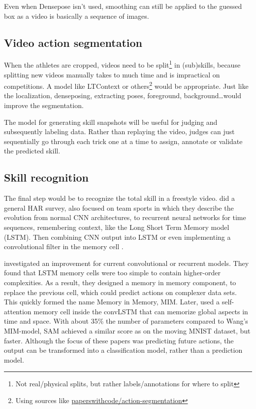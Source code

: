 Even when Densepose isn’t used, smoothing can still be applied to the guessed box as a video is basically a sequence of images.

\subsection{Video action segmentation}

When the athletes are cropped, videos need to be split\footnote{Not real/physical splits, but rather labels/annotations for where to split} in (sub)skills, because splitting new videos manually takes to much time and is impractical on competitions. A model like LTContext \textcite{Jiaming_2023} or others\footnote{Using sources like \href{https://paperswithcode.com/task/action-segmentation}{paperswithcode/action-segmentation}} would be appropriate.
Just like the localization, denseposing, extracting poses, foreground, background\dots would improve the segmentation.

The model for generating skill snapshots will
be useful for judging and subsequently labeling
data. Rather than replaying the video, judges can
just sequentially go through each trick one at a
time to assign, annotate or validate the predicted
skill.

\subsection{Skill recognition}
\label{subsec:skill-recognition}

The final step would be to recognize the total skill in a freestyle video.
\textcite{Yin_2024} did a general HAR survey, also focused on team sports in which they describe the evolution from normal CNN architectures, to recurrent neural networks for time sequences, remembering context, like the Long Short Term Memory model (LSTM). Then combining CNN output into LSTM or even implementing a convolutional filter in the memory cell \autocite{Shi_2015}.

\textcite{Wang_2019} investigated an improvement for current convolutional or recurrent models. They found that LSTM memory cells were too simple to contain higher-order complexities. As a result, they designed a memory in memory component, to replace the previous cell, which could predict actions on complexer data sets. This quickly formed the name Memory in Memory, MIM. Later, \textcite{Lin_2020} used a self-attention memory cell inside the convLSTM that can memorize global aspects in time and space. With about 35\% the number of parameters compared to Wang's MIM-model, SAM achieved a similar score as on the moving MNIST dataset, but faster. Although the focus of these papers was predicting future actions, the output can be transformed into a classification model, rather than a prediction model.

